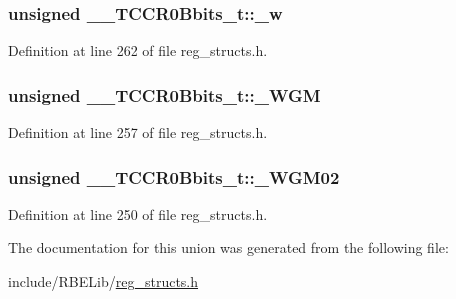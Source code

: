 \hypertarget{union_____t_c_c_r0_bbits__t_a48fc3459d791c25faf5a2e853ae01459}{
\subsubsection[{\+\_\+w}]{\setlength{\rightskip}{0pt plus 5cm}unsigned \+\_\+\+\_\+\+T\+C\+C\+R0\+Bbits\+\_\+t\+::\+\_\+w}}\label{union_____t_c_c_r0_bbits__t_a48fc3459d791c25faf5a2e853ae01459}


Definition at line 262 of file reg\+\_\+structs.\+h.

\hypertarget{union_____t_c_c_r0_bbits__t_ab6d80be66c8a595dc05635ede3f6b277}{
\subsubsection[{\+\_\+\+W\+G\+M}]{\setlength{\rightskip}{0pt plus 5cm}unsigned \+\_\+\+\_\+\+T\+C\+C\+R0\+Bbits\+\_\+t\+::\+\_\+\+W\+G\+M}}\label{union_____t_c_c_r0_bbits__t_ab6d80be66c8a595dc05635ede3f6b277}


Definition at line 257 of file reg\+\_\+structs.\+h.

\hypertarget{union_____t_c_c_r0_bbits__t_a7c0d95d175ca1cbee86c654da6447188}{
\subsubsection[{\+\_\+\+W\+G\+M02}]{\setlength{\rightskip}{0pt plus 5cm}unsigned \+\_\+\+\_\+\+T\+C\+C\+R0\+Bbits\+\_\+t\+::\+\_\+\+W\+G\+M02}}\label{union_____t_c_c_r0_bbits__t_a7c0d95d175ca1cbee86c654da6447188}


Definition at line 250 of file reg\+\_\+structs.\+h.



The documentation for this union was generated from the following file\+:\begin{DoxyCompactItemize}
\item 
include/\+R\+B\+E\+Lib/\hyperlink{reg__structs_8h}{reg\+\_\+structs.\+h}\end{DoxyCompactItemize}

